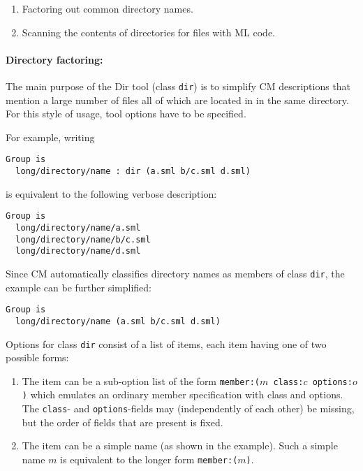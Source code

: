 \begin{enumerate}
\item Factoring out common directory names.
\item Scanning the contents of directories for files with ML code.
\end{enumerate}

\paragraph{Directory factoring:}
The main purpose of the Dir tool (class {\tt dir}) is to simplify CM
descriptions that mention a large number of files all of which are
located in in the same directory.  For this style of usage, tool
options have to be specified.

For example, writing

\begin{lstlisting}[language=CM]
Group is
  long/directory/name : dir (a.sml b/c.sml d.sml)
\end{lstlisting}%

is equivalent to the following verbose description:

\begin{lstlisting}[language=CM]
Group is
  long/directory/name/a.sml
  long/directory/name/b/c.sml
  long/directory/name/d.sml
\end{lstlisting}%

Since CM automatically classifies directory names as members of class
{\tt dir}, the example can be further simplified:

\begin{lstlisting}[language=CM]
Group is
  long/directory/name (a.sml b/c.sml d.sml)
\end{lstlisting}%

Options for class {\tt dir} consist of a list of items, each item
having one of two possible forms:

\begin{enumerate}
\item The item can be a sub-option list of the form
{\tt member:($m$ class:$c$ options:$o$)} which emulates an ordinary
member specification with class and options.  The {\tt class}- and
{\tt options}-fields may (independently of each other) be missing, but
the order of fields that are present is fixed.
\item The item can be a simple name (as shown in the example).  Such a
simple name $m$ is equivalent to the longer form {\tt member:($m$)}.
\end{enumerate}


